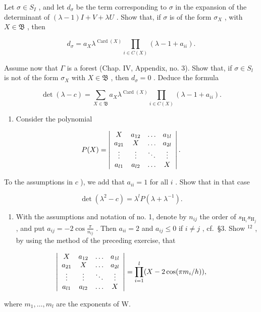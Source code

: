 Let \(\sigma \in S_{I}\) , and let \(d_{\sigma}\) be the term corresponding to \(\sigma\) in the expansion of the determinant of \((\lambda - 1)I + V + \lambda U\) . Show that, if \(\sigma\) is of the form \(\sigma_{X}\) , with \(X \in \mathfrak{B}\) , then

\[
d _ {\sigma} = a _ {X} \lambda^ {\operatorname{Card} (X)} \prod_ {i \in C (X)} (\lambda - 1 + a _ {i i}).
\]

Assume now that \(\Gamma\) is a forest (Chap. IV, Appendix, no. 3). Show that, if \(\sigma \in S_l\) is not of the form \(\sigma_X\) with \(X \in \mathfrak{B}\) , then \(d_{\sigma} = 0\) . Deduce the formula

\[
\det (\lambda - c) = \sum_ {X \in \mathfrak {B}} a _ {X} \lambda^ {\operatorname{Card} (X)} \prod_ {i \in C (X)} (\lambda - 1 + a _ {i i}).
\]

\begin{enumerate}
\def\labelenumi{\alph{enumi})}
\setcounter{enumi}{3}
\tightlist
\item
  Consider the polynomial
\end{enumerate}

\[
P (X) = \left| \begin{array}{c c c c} X & a _ {1 2} & \ldots & a _ {1 l} \\ a _ {2 1} & X & \ldots & a _ {2 l} \\ \vdots & \vdots & \ddots & \vdots \\ a _ {l 1} & a _ {l 2} & \ldots & X \end{array} \right|.
\]

To the assumptions in \(c\) ), we add that \(a_{ii} = 1\) for all \(i\) . Show that in that case

\[
\det (\lambda^ {2} - c) = \lambda^ {l} P (\lambda + \lambda^ {- 1}).
\]

\begin{enumerate}
\def\labelenumi{\arabic{enumi})}
\setcounter{enumi}{3}
\tightlist
\item
  With the assumptions and notation of no. 1, denote by \(n_{ij}\) the order of \(s_{\mathrm{H}_i}s_{\mathrm{H}_j}\) , and put \(a_{ij} = -2\cos \frac{\pi}{n_{ij}}\) . Then \(a_{ii} = 2\) and \(a_{ij} \leqslant 0\) if \(i \neq j\) , cf.~§3. Show \(^{12}\) , by using the method of the preceding exercise, that
\end{enumerate}

\[
\left| \begin{array}{c c c c} X & a _ {1 2} & \ldots & a _ {1 l} \\ a _ {2 1} & X & \ldots & a _ {2 l} \\ \vdots & \vdots & \ddots & \vdots \\ a _ {l 1} & a _ {l 2} & \ldots & X \end{array} \right| = \prod_ {i = 1} ^ {l} (X - 2 \cos (\pi m _ {i} / h)),
\]

where \(m_{1},\ldots ,m_{l}\) are the exponents of W.

